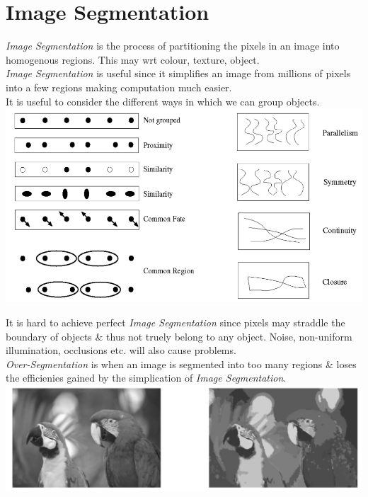 \documentclass[11pt,a4paper]{article}
\begin{document}
\section{Image Segmentation}

\textit{Image Segmentation} is the process of partitioning the pixels in an image into homogenous regions. This may wrt colour, texture, object.\\

\textit{Image Segmentation} is useful since it simplifies an image from millions of pixels into a few regions making computation much easier.\\

It is useful to consider the different ways in which we can group objects.\\
\includegraphics[scale=.5]{img/gestalt.png}

It is hard to achieve perfect \textit{Image Segmentation} since pixels may straddle the boundary of objects \& thus not truely belong to any object. Noise, non-uniform illumination, occlusions etc. will also cause problems.\\

\textit{Over-Segmentation} is when an image is segmented into too many regions \& loses the efficienies gained by the simplication of \textit{Image Segmentation}.\\

\includegraphics[scale=1]{img/overSegmentation.png}
\end{document}
